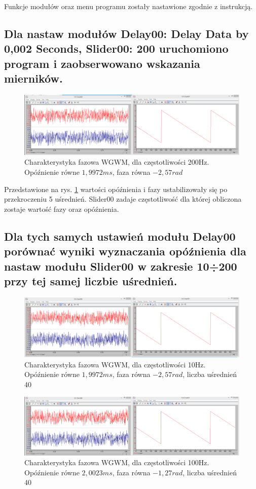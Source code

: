 \documentclass{classrep}
\begin{document}
Funkcje modułów oraz menu programu zostały nastawione zgodnie z instrukcją.  

\subsection{Dla nastaw modułów Delay00:  Delay Data by 0,002 Seconds, Slider00: 200 uruchomiono program i zaobserwowano wskazania mierników.}

\begin{figure}[H]
\centering
\includegraphics[width=1\linewidth]{wyk4}
\caption{Charakterystyka fazowa WGWM, dla częstotliwości 200Hz. Opóźnienie równe $1,9972ms$, faza równa $-2,57rad$}
\label{fig:wyk4}
\end{figure}

Przedstawione na rys. \ref{fig:wyk4} wartości opóźnienia i fazy ustabilizowały się po przekroczeniu 5 uśrednień. Slider00 zadaje częstotliwość dla której obliczona zostaje wartość fazy oraz opóźnienia. 

\subsection{Dla tych samych ustawień modułu \textbf{Delay00} porównać wyniki wyznaczania opóźnienia dla nastaw modułu \textbf{Slider00} w zakresie 10÷200 przy tej samej liczbie uśrednień.}

\begin{figure}[H]
\centering
\includegraphics[width=1\linewidth]{wyk5}
\caption{Charakterystyka fazowa WGWM, dla częstotliwości 10Hz. Opóźnienie równe $1,9972ms$, faza równa $-2,57rad$, liczba uśrednień 40}
\label{fig:wyk5}
\end{figure}

\begin{figure}[H]
	\centering
	\includegraphics[width=1\linewidth]{wyk6}
	\caption{Charakterystyka fazowa WGWM, dla częstotliwości 100Hz. Opóźnienie równe $2,0023ms$, faza równa $-1,27rad$, liczba uśrednień 40 }
	\label{fig:wyk6}
\end{figure}
\end{document}
